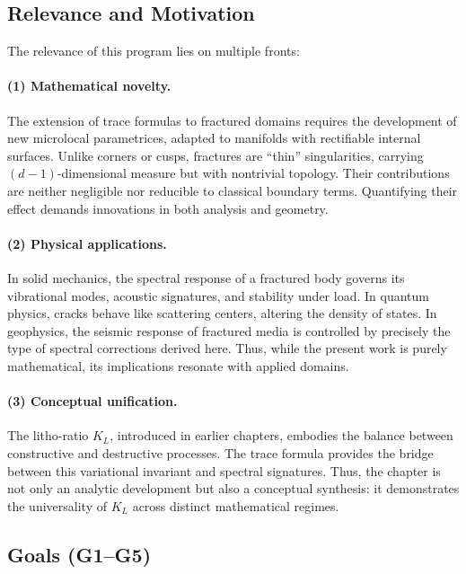 \subsection*{Relevance and Motivation}

The relevance of this program lies on multiple fronts:

\paragraph{(1) Mathematical novelty.}  
The extension of trace formulas to fractured domains requires the development of new microlocal parametrices, adapted to manifolds with rectifiable internal surfaces. Unlike corners or cusps, fractures are ``thin'' singularities, carrying $(d-1)$-dimensional measure but with nontrivial topology. Their contributions are neither negligible nor reducible to classical boundary terms. Quantifying their effect demands innovations in both analysis and geometry.

\paragraph{(2) Physical applications.}  
In solid mechanics, the spectral response of a fractured body governs its vibrational modes, acoustic signatures, and stability under load. In quantum physics, cracks behave like scattering centers, altering the density of states. In geophysics, the seismic response of fractured media is controlled by precisely the type of spectral corrections derived here. Thus, while the present work is purely mathematical, its implications resonate with applied domains.

\paragraph{(3) Conceptual unification.}  
The litho-ratio $K_L$, introduced in earlier chapters, embodies the balance between constructive and destructive processes. The trace formula provides the bridge between this variational invariant and spectral signatures. Thus, the chapter is not only an analytic development but also a conceptual synthesis: it demonstrates the universality of $K_L$ across distinct mathematical regimes.

\subsection*{Goals (G1–G5)}

